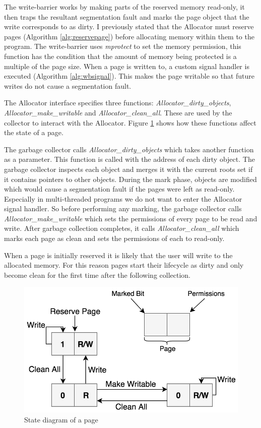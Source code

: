 \documentclass[../diss.tex]{subfiles}
\begin{document}
The write-barrier works by making parts of the reserved memory read-only, it then traps the resultant segmentation fault and marks the page object that the write corresponds to as dirty. I previously stated that the Allocator must reserve pages (Algorithm \ref{alg:reservepage}) before allocating memory within them to the program. The write-barrier uses \emph{mprotect} to set the memory permission, this function has the condition that the amount of memory being protected is a multiple of the page size. When a page is written to, a custom signal handler is executed (Algorithm \ref{alg:wbsignal}). This makes the page writable so that future writes do not cause a segmentation fault.

The Allocator interface specifies three functions: \emph{Allocator\_dirty\_objects}, \emph{Allocator\_make\_writable} and \emph{Allocator\_clean\_all}. These are used by the collector to interact with the Allocator. Figure \ref{fig:page_lifecycle} shows how these functions affect the state of a page.

The garbage collector calls \emph{Allocator\_dirty\_objects} which takes another function as a parameter. This function is called with the address of each dirty object. The garbage collector inspects each object and merges it with the current roots set if it contains pointers to other objects. During the mark phase, objects are modified which would cause a segmentation fault if the pages were left as read-only. Especially in multi-threaded programs we do not want to enter the Allocator signal handler. So before performing any marking, the garbage collector calls \emph{Allocator\_make\_writable} which sets the permissions of every page to be read and write. After garbage collection completes, it calls \emph{Allocator\_clean\_all} which marks each page as clean and sets the permissions of each to read-only.

When a page is initially reserved it is likely that the user will write to the allocated memory. For this reason pages start their lifecycle as dirty and only become clean for the first time after the following collection. 

\begin{figure}
    \centering
    \includegraphics[max width=\linewidth]{figs/page_lifecycle.png}
    \caption{State diagram of a page}
    \label{fig:page_lifecycle}
\end{figure}
\end{document}
